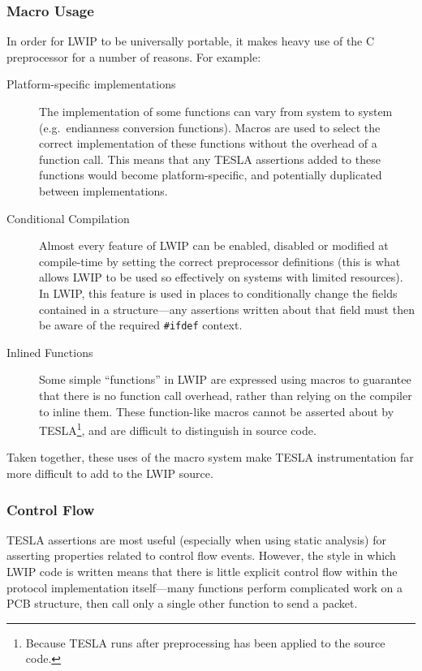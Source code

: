 \subsubsection{Macro Usage}

In order for LWIP to be universally portable, it makes heavy use of the
C preprocessor for a number of reasons. For example:
\begin{description}
  \item[Platform-specific implementations] The implementation of some
  functions can vary from system to system (e.g.\ endianness conversion
  functions). Macros are used to select the correct implementation of
  these functions without the overhead of a function call. This means
  that any TESLA assertions added to these functions would become
  platform-specific, and potentially duplicated between implementations.

  \item[Conditional Compilation] Almost every feature of LWIP can be
  enabled, disabled or modified at compile-time by setting the correct
  preprocessor definitions (this is what allows LWIP to be used so
  effectively on systems with limited resources). In LWIP, this feature
  is used in places to conditionally change the fields contained in a
  structure---any assertions written about that field must then be aware
  of the required \texttt{#ifdef} context.

  \item[Inlined Functions] Some simple ``functions'' in LWIP are expressed using
    macros to guarantee that there is no function call overhead, rather than
    relying on the compiler to inline them. These function-like macros cannot be
    asserted about by TESLA\footnote{Because TESLA runs after preprocessing has
    been applied to the source code.}, and are difficult to distinguish in source code.
\end{description}

Taken together, these uses of the macro system make TESLA
instrumentation far more difficult to add to the LWIP source.

\subsubsection{Control Flow}

TESLA assertions are most useful (especially when using static analysis)
for asserting properties related to control flow events. However, the
style in which LWIP code is written means that there is little explicit
control flow within the protocol implementation itself---many functions
perform complicated work on a PCB structure, then call only a single
other function to send a packet.

